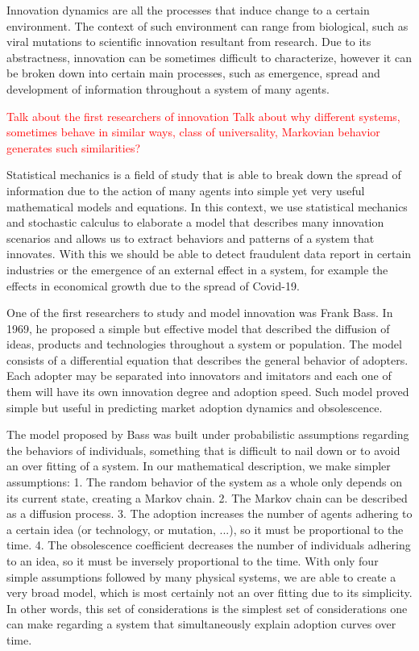 Innovation dynamics are all the processes that induce change to a certain environment. The context of such environment can range from biological, such as viral mutations to scientific innovation resultant from research. Due to its abstractness, innovation can be sometimes difficult to characterize, however it can be broken down into certain main processes, such as emergence, spread and development of information throughout a system of many agents. 

\textcolor{red}{Talk about the first researchers of innovation}
\textcolor{red}{Talk about why different systems, sometimes behave in similar ways, class of universality, Markovian behavior generates such similarities?}

Statistical mechanics is a field of study that is able to break down the spread of information due to the action of many agents into simple yet very useful mathematical models and equations. In this context, we use statistical mechanics and stochastic calculus to elaborate a model that describes many innovation scenarios and allows us to extract behaviors and patterns of a system that innovates. With this we should be able to detect fraudulent data report in certain industries or the emergence of an external effect in a system, for example the effects in economical growth due to the spread of Covid-19.

One of the first researchers to study and model innovation was Frank Bass. In 1969, he proposed a simple but effective model that described the diffusion of ideas, products and technologies throughout a system or population. The model consists of a differential equation that describes the general behavior of adopters. Each adopter may be separated into innovators and imitators and each one of them will have its own innovation degree and adoption speed. Such model proved simple but useful in predicting market adoption dynamics and obsolescence.

The model proposed by Bass was built under probabilistic assumptions regarding the behaviors of individuals, something that is difficult to nail down or to avoid an over fitting of a system. In our mathematical description, we make simpler assumptions: 1. The random behavior of the system as a whole only depends on its current state, creating a Markov chain. 2. The Markov chain can be described as a diffusion process. 3. The adoption increases the number of agents adhering to a certain idea (or technology, or mutation, ...), so it must be proportional to the time. 4. The obsolescence coefficient decreases the number of individuals adhering to an idea, so it must be inversely proportional to the time. With only four simple assumptions followed by many physical systems, we are able to create a very broad model, which is most certainly not an over fitting due to its simplicity. In other words, this set of considerations is the simplest set of considerations one can make regarding a system that simultaneously explain adoption curves over time.

